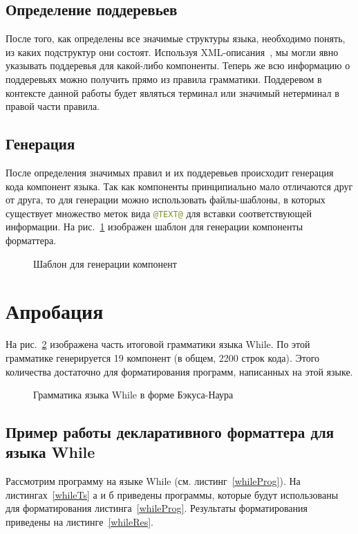 \documentclass[conference]{IEEEtran}
\begin{document}
\subsection{Определение поддеревьев}
После того, как определены все значимые структуры языка, необходимо понять, из каких подструктур они состоят.
Используя XML-описания~\cite{while}, мы могли явно указывать поддеревья для какой-либо компоненты.
Теперь же всю информацию о поддеревьях можно получить прямо из правила грамматики.
Поддеревом в контексте данной работы будет являться терминал или значимый нетерминал в правой части правила.

\subsection{Генерация}
После определения значимых правил и их поддеревьев происходит генерация кода компонент языка.
Так как компоненты принципиально мало отличаются друг от друга, то для генерации можно использовать файлы-шаблоны, в которых существует множество меток вида \lstinline[language=java]{@TEXT@} для вставки соответствующей информации.
На рис.~\ref{component} изображен шаблон для генерации компоненты форматтера.
\begin{figure}[h]
	\centering
	
	\caption{Шаблон для генерации компонент}
	\label{component}
\end{figure}

\section{Апробация}
На рис.~\ref{whileBnf} изображена часть итоговой грамматики языка While.
По этой грамматике генерируется 19 компонент (в общем, 2200 строк кода).
Этого количества достаточно для форматирования программ, написанных на этой языке.

\begin{figure}[h]
	\centering
	
	\caption{Грамматика языка While в форме Бэкуса-Наура}
	\label{whileBnf}
\end{figure}

\subsection{Пример работы декларативного форматтера для языка While}
Рассмотрим программу на языке While (см. листинг~\ref{whileProg}).
На листингах~\ref{whileTs} а и б приведены программы, которые будут использованы для форматирования листинга~\ref{whileProg}.
Результаты форматирования приведены на листинге~\ref{whileRes}.
\end{document}
